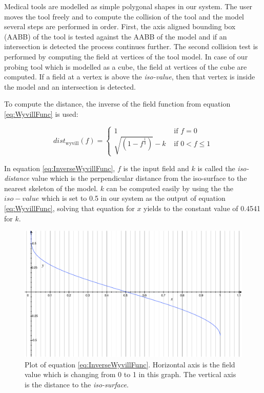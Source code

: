 Medical tools are modelled as simple polygonal shapes in our system. The user moves the tool freely 
and to compute the collision of the tool and the model several steps are performed in order. First, the 
axis aligned bounding box (AABB) of the tool is tested against the AABB of the model and if an 
intersection is detected the process continues further. The second collision 
test is performed by computing the field at vertices of the tool model. In case 
of our probing tool which is modelled as a cube, the field at vertices of the cube are computed. 
If a field at a vertex is above the \textit{iso-value}, then that vertex is inside the model and an intersection 
is detected.

To compute the distance, the inverse of the field function from equation \ref{eq:WyvillFunc} 
is used:

\begin{equation}
dist_\mathrm{wyvill}(f)= \left\{ \begin{array}{rl}
 1 &\mbox{ if $f = 0$} \\
\sqrt{ (1-f^\frac{1}{3}) } - k &\mbox{ if $0 < f \leq 1$}
 \end{array} \right.
\label{eq:InverseWyvillFunc}
\end{equation}

In equation \ref{eq:InverseWyvillFunc}, $f$ is the input field and $k$ is called the 
\textit{iso-distance} value which is the perpendicular distance from the iso-surface to the nearest skeleton 
of the model. $k$ can be computed easily by using the the $iso-value$ which is set to 0.5 in our system 
as the output of equation \ref{eq:WyvillFunc}, solving that equation for $x$ yields to the constant value of 
0.4541 for $k$. 


\begin{figure}[H]
  \centering
  \includegraphics[width=0.8\linewidth]{figures/deformable/distancefromfield.pdf}
  \caption{\label{fig:distancefromfield}
  {Plot of equation \ref{eq:InverseWyvillFunc}. Horizontal axis is the field value which is changing from 0 to 1
 in this graph. The vertical axis is the distance to the \textit{iso-surface}.}
}
\end{figure}

